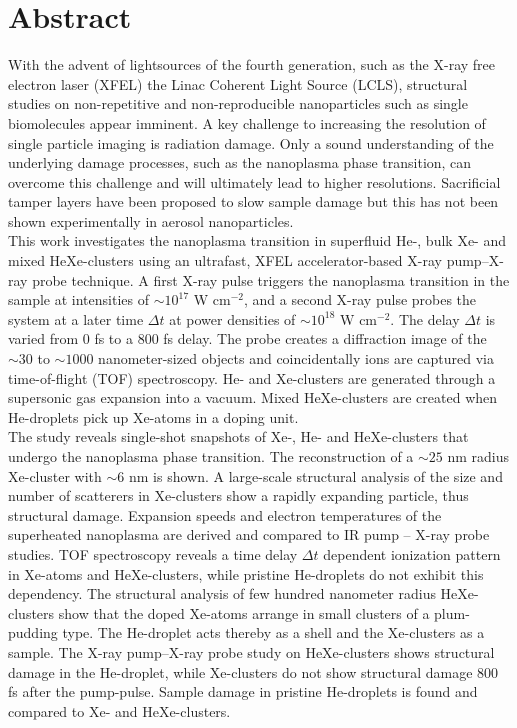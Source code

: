 \section*{Abstract}\label{ch:abstract}
With the advent of lightsources of the fourth generation, such as the X-ray free electron laser (XFEL) the Linac Coherent Light Source (LCLS), structural studies on non-repetitive and non-reproducible nanoparticles such as single biomolecules appear imminent. A key challenge to increasing the resolution of single particle imaging is radiation damage. Only a sound understanding of the underlying damage processes, such as the nanoplasma phase transition, can overcome this challenge and will ultimately lead to higher resolutions. Sacrificial tamper layers have been proposed to slow sample damage but this has not been shown experimentally in aerosol nanoparticles.\\[1\baselineskip]
This work investigates the nanoplasma transition in superfluid He-, bulk Xe- and mixed HeXe-clusters using an ultrafast, XFEL accelerator-based X-ray pump--X-ray probe technique. A first X-ray pulse triggers the nanoplasma transition in the sample at intensities of $\sim 10^{17}$ W cm$^{-2}$, and a second X-ray pulse probes the system at a later time $\Delta t$ at power densities of $\sim 10^{18}$ W cm$^{-2}$. The delay $\Delta t$ is varied from 0 fs to a 800 fs delay. The probe creates a diffraction image of the $\sim 30$ to $\sim 1000$ nanometer-sized objects and coincidentally ions are captured via time-of-flight (TOF) spectroscopy. He- and Xe-clusters are generated through a supersonic gas expansion into a vacuum. Mixed HeXe-clusters are created when He-droplets pick up Xe-atoms in a doping unit.\\[1\baselineskip]
The study reveals single-shot snapshots of Xe-, He- and HeXe-clusters that undergo the nanoplasma phase transition. The reconstruction of a $\sim 25$ nm radius Xe-cluster with $\sim 6$ nm is shown. A large-scale structural analysis of the size and number of scatterers in Xe-clusters show a rapidly expanding particle, thus structural damage. Expansion speeds and electron temperatures of the superheated nanoplasma are derived and compared to IR pump -- X-ray probe studies. TOF spectroscopy reveals a time delay $\Delta t$ dependent ionization pattern in Xe-atoms and HeXe-clusters, while pristine He-droplets do not exhibit this dependency. The structural analysis of few hundred nanometer radius HeXe-clusters show that the doped Xe-atoms arrange in small clusters of a plum-pudding type. The He-droplet acts thereby as a shell and the Xe-clusters as a sample. The X-ray pump--X-ray probe study on HeXe-clusters shows structural damage in the He-droplet, while Xe-clusters do not show structural damage 800 fs after the pump-pulse. Sample damage in pristine He-droplets is found and compared to Xe- and HeXe-clusters.
%
%
%
%